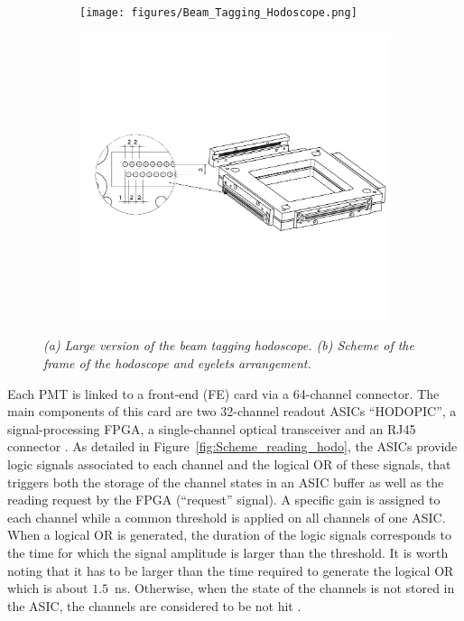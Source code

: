 \documentclass[a4paper,11pt]{article}
\begin{document}
\begin{figure}[htb]
\centering
\begin{subfigure}{0.4\textwidth} \centering
\texttt{[image: figures/Beam\_Tagging\_Hodoscope.png]}\caption{}
\label{fig:hodoscope}
\end{subfigure}
\begin{subfigure}{0.4\textwidth} \centering
\includegraphics[width=\textwidth]{figures/Hodoscope_Frame_Scheme.pdf}\caption{}
\label{fig:frame_hodoscope}
\end{subfigure}
\caption{\small{\textit{(a) Large version of the beam tagging hodoscope. (b) Scheme of the frame of the hodoscope and eyelets arrangement.}}}
\label{fig:Hodoscope}
\end{figure}

Each PMT is linked to a front-end (FE) card via a 64-channel connector. The main components of this card are two 32-channel readout ASICs \enquote{HODOPIC}, a signal-processing FPGA, a single-channel optical transceiver and an RJ45 connector \cite{Chen2019}. As detailed in Figure~\ref{fig:Scheme_reading_hodo}, the ASICs provide logic signals associated to each channel and the logical OR of these signals, that triggers both the storage of the channel states in an ASIC buffer as well as the reading request by the FPGA (\enquote{request} signal). A specific gain is assigned to each channel while a common threshold is applied on all channels of one ASIC. When a logical OR is generated, the duration of the logic signals corresponds to the time for which the signal amplitude is larger than the threshold. It is worth noting that it has to be larger than the time required to generate the logical OR which is about $1.5$~ns. Otherwise, when the state of the channels is not stored in the ASIC, the channels are considered to be not hit .
\end{document}
